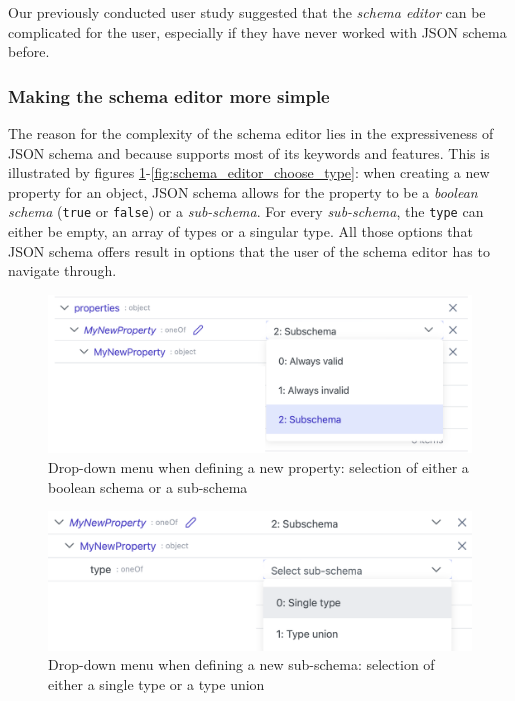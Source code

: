 Our previously conducted user study suggested that the \textit{schema editor} can be complicated for the user, especially if they have never worked with JSON schema before\cite{metaconfigurator}.


\subsubsection{Making the schema editor more simple}

The reason for the complexity of the schema editor lies in the expressiveness of JSON schema and because \toolname{} supports most of its keywords and features.
This is illustrated by figures \ref{fig:schema_editor_choose_jsonschema}-\ref{fig:schema_editor_choose_type}: when creating a new property for an object, JSON schema allows for the property to be a \textit{boolean schema} (\texttt{true} or \texttt{false}) or a \textit{sub-schema}.
For every \textit{sub-schema}, the \texttt{type} can either be empty, an array of types or a singular type.
All those options that JSON schema offers result in options that the user of the schema editor has to navigate through.

\begin{figure}[!t]
    \centering
    \includegraphics[width=\columnwidth]{figures/schema_editor_choose_jsonschema}
    \caption{Drop-down menu when defining a new property: selection of either a boolean schema or a sub-schema}
    \label{fig:schema_editor_choose_jsonschema}
\end{figure}



\begin{figure}[!t]
    \centering
    \includegraphics[width=\columnwidth]{figures/schema_editor_choose_array_or_single_type}
    \caption{Drop-down menu when defining a new sub-schema: selection of either a single type or a type union}
    \label{fig:schema_editor_choose_array_or_single_type}
\end{figure}



